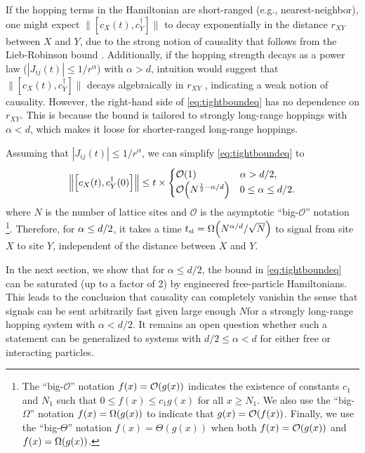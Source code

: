If the hopping terms in the Hamiltonian are short-ranged (e.g., nearest-neighbor), one might expect $\|[c_{X}(t),c_{Y}^{\dagger}]\|$ to decay exponentially in the distance $r_{XY}$ between $X$ and $Y$, due to the strong notion of causality that follows from the Lieb-Robinson bound \cite{LR}.
Additionally, if the hopping strength decays as a power law ($|J_{ij}(t)|\le 1/r^{\alpha}$) with $\alpha>d$, intuition would suggest that $\|[c_{X}(t),c_{Y}^{\dagger}]\|$ decays algebraically in $r_{XY}$ \cite{HK,Gong2014}, indicating a weak notion of causality.
However, the right-hand side of \cref{eq:tightboundeq} has no dependence on $r_{XY}$.
This is because the bound is tailored to strongly long-range hoppings with $\alpha<d$, which makes it loose for shorter-ranged long-range hoppings.

Assuming that $|J_{ij}(t)|\le 1/r^{\alpha}$, we can simplify \cref{eq:tightboundeq} to
\begin{equation}
\left\Vert \left[c_{X}(t),c_{Y}^{\dagger}(0)\right]\right\Vert \le t\times\begin{cases}
\O{1} & \al > d/2,\\
\O{N^{\frac{1}{2}-\al/d}} & 0\le \al\le d/2.
\end{cases}\label{eq:corollary}
\end{equation}
where $N$ is the number of lattice sites and $\mathcal{O}$ is the asymptotic ``big-$\mathcal{O}$'' notation \footnote{The ``big-$\mathcal{O}$'' notation $f(x) = \O{g(x)}$ indicates the existence of constants $c_1$ and $N_1$ such that $0\le f(x) \le c_1g(x)$ for all $x\ge N_1$. We also use the ``big-$\Omega$'' notation $f(x) = \W{g(x)}$ to indicate that $g(x) = \O{f(x)}$. Finally, we use the ``big-$\Theta$'' notation $f(x)=\Theta(g(x))$ when both $f(x)=\O {g(x)}$ and $f(x) = \W {g(x)}$.}. Therefore, for $\alpha\le d/2$, it takes a time $t_\text{si} = \W{N^{\alpha/d}/\sqrt{N}}$ to signal from site $X$ to site $Y$, independent of the distance between $X$ and $Y$.

In the next section, we show that for $\alpha\le d/2$, the bound in \cref{eq:tightboundeq} can be saturated (up to a factor of 2) by engineered free-particle Hamiltonians.
This leads to the conclusion that causality can completely vanish\dash in the sense that signals can be sent arbitrarily fast given large enough $N$\dash for a strongly long-range hopping system with $\alpha<d/2$.
It remains an open question whether such a statement can be generalized to systems with $d/2 \le\alpha<d$ for either free or interacting particles.



